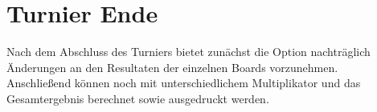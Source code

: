 \section{Turnier Ende}

\noindent
Nach dem Abschluss des Turniers bietet \bb zunächst die Option nachträglich
Änderungen an den Resultaten der einzelnen Boards vorzunehmen.\\[.1cm]
Anschließend können noch \cp mit unterschiedlichem Multiplikator und das
Gesamtergebnis berechnet sowie ausgedruckt werden.
